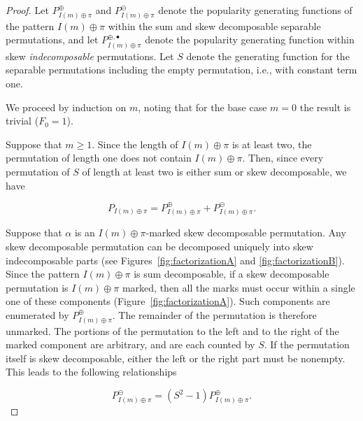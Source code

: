 \documentclass[10pt]{article}
\theoremstyle{definition}
\numberwithin{equation}{section}
\numberwithin{figure}{section}
\begin{document}
\begin{proof}
Let $P_{I(m) \oplus \pi}^\oplus$ and $P_{I(m) \oplus \pi}^\ominus$ denote the popularity generating functions of the pattern $I(m) \oplus \pi$ within the sum and skew decomposable separable permutations, and let $P_{I(m) \oplus \pi}^{\oplus, \bullet}$ denote the popularity generating function within skew \emph{indecomposable} permutations. Let $S$ denote the generating function for the separable permutations including the empty permutation, i.e., with constant term one. 

We proceed by induction on $m$, noting that for the base case $m = 0$ the result is trivial ($F_0 = 1$).  

Suppose that $m \geq 1$. Since the length of $I(m) \oplus \pi$ is at least two, the permutation of length one does not contain $I(m) \oplus \pi$. Then, since every permutation of $S$ of length at least two is either sum or skew decomposable, we have

\begin{equation} \label{eqn:factorization1}
      P_{I(m) \oplus \pi} = 
      P_{I(m) \oplus \pi}^\oplus + P_{I(m) \oplus \pi}^\ominus.
\end{equation}

Suppose that $\alpha$ is an $I(m) \oplus \pi$-marked skew decomposable permutation. Any skew decomposable permutation can be decomposed uniquely into skew indecomposable parts (see Figures~\ref{fig:factorizationA} and \ref{fig:factorizationB}). Since the pattern $I(m) \oplus \pi$ is sum decomposable, if a skew decomposable permutation is $I(m) \oplus \pi$ marked, then all the marks must occur within a single one of these components (Figure~\ref{fig:factorizationA}). Such components are enumerated by $P_{I(m) \oplus \pi}^\oplus$. The remainder of the permutation is therefore unmarked. The portions of the permutation to the left and to the right of the marked component are arbitrary, and are each counted by $S$. If the permutation itself is skew decomposable, either the left or the right part must be nonempty. This leads to the following relationships

\begin{equation}\label{eqn:factorization3}
      P_{I(m) \oplus \pi}^\ominus = 
        (S^2-1) P_{I(m) \oplus \pi}^\oplus.
\end{equation}


\end{proof}
\end{document}
